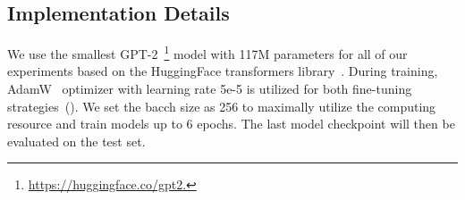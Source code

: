 
\subsection{Implementation Details}
We use the smallest GPT-2~\footnote{\url{https://huggingface.co/gpt2.}} model with 117M parameters for all of our experiments based on the HuggingFace transformers library~\cite{transformers}. During training, AdamW~\cite{adamw} optimizer with learning rate 5e-5 is utilized for both fine-tuning strategies~(). 
We set the bacch size as 256 to maximally utilize the computing resource and train models up to 6 epochs. The last model checkpoint will then be evaluated on the test set.

